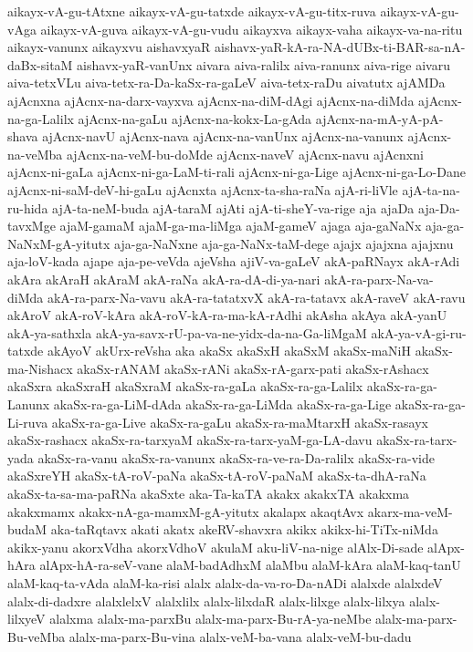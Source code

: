 {aikayx-vA-gu-tAtxne
aikayx-vA-gu-tatxde
aikayx-vA-gu-titx-ruva
aikayx-vA-gu-vAga
aikayx-vA-guva
aikayx-vA-gu-vudu
aikayxva
aikayx-vaha
aikayx-va-na-ritu
aikayx-vanunx
aikayxvu
aishavxyaR
aishavx-yaR-kA-ra-NA-dUBx-ti-BAR-sa-nA-daBx-sitaM
aishavx-yaR-vanUnx
aivara
aiva-ralilx
aiva-ranunx
aiva-rige
aivaru
aiva-tetxVLu
aiva-tetx-ra-Da-kaSx-ra-gaLeV
aiva-tetx-raDu
aivatutx
ajAMDa
ajAcnxna
ajAcnx-na-darx-vayxva
ajAcnx-na-diM-dAgi
ajAcnx-na-diMda
ajAcnx-na-ga-Lalilx
ajAcnx-na-gaLu
ajAcnx-na-kokx-La-gAda
ajAcnx-na-mA-yA-pA-shava
ajAcnx-navU
ajAcnx-nava
ajAcnx-na-vanUnx
ajAcnx-na-vanunx
ajAcnx-na-veMba
ajAcnx-na-veM-bu-doMde
ajAcnx-naveV
ajAcnx-navu
ajAcnxni
ajAcnx-ni-gaLa
ajAcnx-ni-ga-LaM-ti-rali
ajAcnx-ni-ga-Lige
ajAcnx-ni-ga-Lo-Dane
ajAcnx-ni-saM-deV-hi-gaLu
ajAcnxta
ajAcnx-ta-sha-raNa
ajA-ri-liVle
ajA-ta-na-ru-hida
ajA-ta-neM-buda
ajA-taraM
ajAti
ajA-ti-sheY-va-rige
aja
ajaDa
aja-Da-tavxMge
ajaM-gamaM
ajaM-ga-ma-liMga
ajaM-gameV
ajaga
aja-gaNaNx
aja-ga-NaNxM-gA-yitutx
aja-ga-NaNxne
aja-ga-NaNx-taM-dege
ajajx
ajajxna
ajajxnu
aja-loV-kada
ajape
aja-pe-veVda
ajeVsha
ajiV-va-gaLeV
akA-paRNayx
akA-rAdi
akAra
akAraH
akAraM
akA-raNa
akA-ra-dA-di-ya-nari
akA-ra-parx-Na-va-diMda
akA-ra-parx-Na-vavu
akA-ra-tatatxvX
akA-ra-tatavx
akA-raveV
akA-ravu
akAroV
akA-roV-kAra
akA-roV-kA-ra-ma-kA-rAdhi
akAsha
akAya
akA-yanU
akA-ya-sathxla
akA-ya-savx-rU-pa-va-ne-yidx-da-na-Ga-liMgaM
akA-ya-vA-gi-ru-tatxde
akAyoV
akUrx-reVsha
aka
akaSx
akaSxH
akaSxM
akaSx-maNiH
akaSx-ma-Nishacx
akaSx-rANAM
akaSx-rANi
akaSx-rA-garx-pati
akaSx-rAshacx
akaSxra
akaSxraH
akaSxraM
akaSx-ra-gaLa
akaSx-ra-ga-Lalilx
akaSx-ra-ga-Lanunx
akaSx-ra-ga-LiM-dAda
akaSx-ra-ga-LiMda
akaSx-ra-ga-Lige
akaSx-ra-ga-Li-ruva
akaSx-ra-ga-Live
akaSx-ra-gaLu
akaSx-ra-maMtarxH
akaSx-rasayx
akaSx-rashacx
akaSx-ra-tarxyaM
akaSx-ra-tarx-yaM-ga-LA-davu
akaSx-ra-tarx-yada
akaSx-ra-vanu
akaSx-ra-vanunx
akaSx-ra-ve-ra-Da-ralilx
akaSx-ra-vide
akaSxreYH
akaSx-tA-roV-paNa
akaSx-tA-roV-paNaM
akaSx-ta-dhA-raNa
akaSx-ta-sa-ma-paRNa
akaSxte
aka-Ta-kaTA
akakx
akakxTA
akakxma
akakxmamx
akakx-nA-ga-mamxM-gA-yitutx
akalapx
akaqtAvx
akarx-ma-veM-budaM
aka-taRqtavx
akati
akatx
akeRV-shavxra
akikx
akikx-hi-TiTx-niMda
akikx-yanu
akorxVdha
akorxVdhoV
akulaM
aku-liV-na-nige
alAlx-Di-sade
alApx-hAra
alApx-hA-ra-seV-vane
alaM-badAdhxM
alaMbu
alaM-kAra
alaM-kaq-tanU
alaM-kaq-ta-vAda
alaM-ka-risi
alalx
alalx-da-va-ro-Da-nADi
alalxde
alalxdeV
alalx-di-dadxre
alalxlelxV
alalxlilx
alalx-lilxdaR
alalx-lilxge
alalx-lilxya
alalx-lilxyeV
alalxma
alalx-ma-parxBu
alalx-ma-parx-Bu-rA-ya-neMbe
alalx-ma-parx-Bu-veMba
alalx-ma-parx-Bu-vina
alalx-veM-ba-vana
alalx-veM-bu-dadu
}
